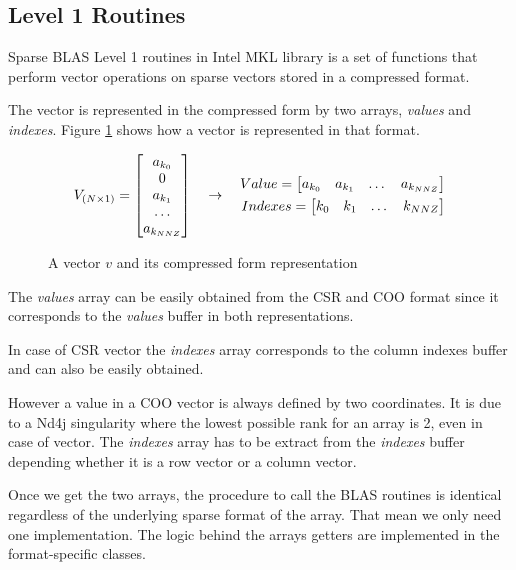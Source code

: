 \subsection{Level 1 Routines}

Sparse BLAS Level 1 routines in Intel MKL library \cite{mkllvl1} is a set of functions that perform vector operations on sparse vectors stored in a compressed format.	

The vector is represented in the compressed form by two arrays, \textit{values} and \textit{indexes}. Figure \ref{fig:compressedVector} shows how a vector is represented in that format.

\begin{figure}[h]
	\[
	\centering
	V_{(N\times 1)} = 
	\begin{bmatrix}
	a_{k_{0}}\\
	0\\
	a_{k_{1}}\\
	\dots\\
	a_{k_{NNZ}}
	\end{bmatrix}
	\quad\rightarrow\quad
	\begin{aligned}
		Value = 
		\begin{bmatrix}
		a_{k_{0}}& a_{{k_{1}}} & \dots & a_{k_{NNZ}}
		\end{bmatrix}\\
		Indexes = 
		\begin{bmatrix}
		k_{0} & k_{1} & \dots & k_{NNZ}		
		\end{bmatrix}
	\end{aligned}
	\]
	\caption{A vector $v$ and its compressed form representation}
	\label{fig:compressedVector}
\end{figure}

The \textit{values} array can be easily obtained from the CSR and COO format since it corresponds to the \textit{values} buffer in both representations.

In case of CSR vector the \textit{indexes} array corresponds to the column indexes buffer and can also be easily obtained.

However a value in a COO vector is always defined by two coordinates. It is due to a Nd4j singularity where the lowest possible rank for an array is 2, even in case of vector. The \textit{indexes} array has to be extract from the \textit{indexes} buffer depending whether it is a row vector or a column vector.

Once we get the two arrays, the procedure to call the BLAS routines is identical regardless of the underlying sparse format of the array. That mean we only need one implementation. The logic behind the arrays getters are implemented in the format-specific classes. 


